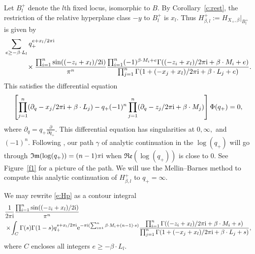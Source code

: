 \documentclass[pdftex]{sigma}
\numberwithin{equation}{section}
\newcommand{\MB}{M}
\newcommand{\LB}{L}
\newcommand{\z}{z}
\newcommand{\x}{x}
\begin{document}
Let $B_l^{+}$ denote the $l$th fixed locus, isomorphic to $B$. By Corollary~\ref{c:rest}, the restriction of the relative hyperplane class $-y$ to $B_l^{+}$ is $ \x_l$. Thus $H_{\beta,l}^{+} :=H_{X_{+}, \beta}|_{B_l^{+}}$ is given by
\begin{align}
&\sum_{e \geq -\beta \cdot \LB_l} q_+^{e+ \x_l/2 \pi {\rm i}}\nonumber\\
&\hphantom{\sum_{e \geq -\beta \cdot \LB_l}}{}\times\frac{ \prod_{i=1}^n \sin( (-\z_i+\x_l)/2 {\rm i}) }{\pi^n}\frac{\prod_{i=1}^n (-1)^{\beta \cdot \MB_i + e}\Gamma((-\z_i+\x_l)/2 \pi {\rm i} + \beta \cdot \MB_i + e)}
{\prod_{j=1}^n \Gamma(1 + (- \x_j+\x_l)/2 \pi {\rm i} + \beta \cdot \LB_j+e) }.\label{e:Hp}
\end{align}
This satisfies the differential equation
\[
\left[\prod_{j=1}^n (\partial_q -x_j/2 \pi {\rm i} + \beta \cdot L_j) - q_+(-1)^n\prod_{j=1}^n (\partial_q -z_j/2 \pi {\rm i} + \beta \cdot M_j) \right] \Phi(q_+) = 0,
\]
where $\partial_q = q_{+} \frac{\partial}{\partial q_{+}}$. This differential equation has singularities at $0, \infty,$ and $(-1)^n$. Following \cite{CIJ}, our path $\gamma$ of analytic continuation in the $\log(q_{+})$ will go through $\mathfrak{Im}(\log(q_{+})) = (n-1)\pi {\rm i}$ when $\mathfrak{Re}(\log(q_{+}))$ is close to 0. See Figure~\ref{f1} for a picture of the path.
We will use the Mellin--Barnes method to compute this analytic continuation of $H_{\beta,l}^{+}$ to $q_+ = \infty$.

We may rewrite \eqref{e:Hp} as a contour integral
\begin{align} \label{e:cint}&\frac{1}{2 \pi {\rm i}}\frac{ \prod_{i=1}^n \sin( (-\z_i+\x_l)/2 {\rm i}) }{\pi^n} \\
&\times\! \int_C \Gamma( s) \Gamma(1 - s) q_+^{s + \x_l/2 \pi {\rm i}} {\rm e}^{ -\pi {\rm i} (\sum_{i=1}^n \beta \cdot \MB_i+(n-1)\cdot s)} \frac{ \prod_{i=1}^n \Gamma((-\z_i+\x_l)/2 \pi {\rm i} + \beta \cdot \MB_i + s)}
{\prod_{j=1}^n \Gamma(1 + (- \x_j+\x_l)/2 \pi {\rm i} + \beta \cdot \LB_j+s) },
\nonumber \end{align}
where $C$ encloses all integers $e \geq -\beta \cdot \LB_l$.
\end{document}
